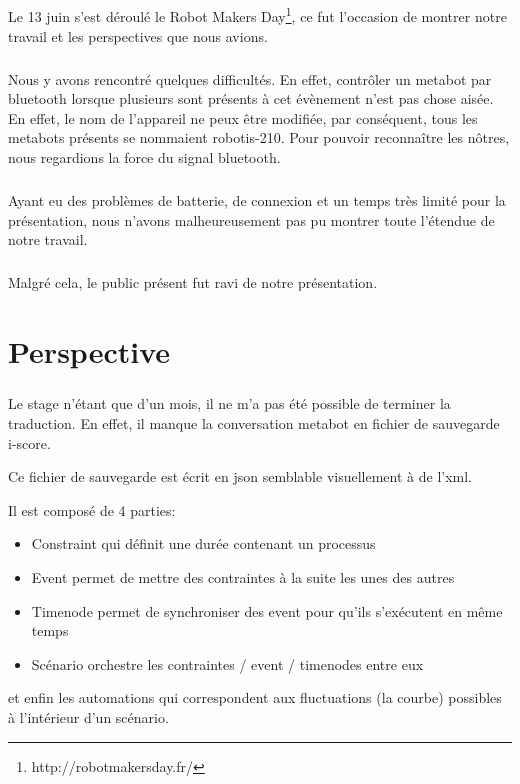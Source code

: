 \documentclass[10pt,a4paper]{report}
\begin{document}
\paragraph{}
Le 13 juin s'est déroulé le Robot Makers Day\footnote{http://robotmakersday.fr/}, ce fut l'occasion de montrer notre travail et les perspectives que nous avions.
\paragraph{}
Nous y avons rencontré quelques difficultés. En effet, contrôler un metabot par bluetooth lorsque plusieurs sont présents à cet évènement n'est pas chose aisée. En effet, le nom de l'appareil ne peux être modifiée, par conséquent, tous les metabots présents se nommaient robotis-210. Pour pouvoir reconnaître les nôtres, nous regardions la force du signal bluetooth.
\paragraph{}
Ayant eu des problèmes de batterie, de connexion et un temps très limité pour la présentation, nous n'avons malheureusement pas pu montrer toute l'étendue de notre travail.
\paragraph{}
Malgré cela, le public présent fut ravi de notre présentation.

\paragraph{}
\chapter{Perspective}
\paragraph{}
Le stage n'étant que d'un mois, il ne m'a pas été possible de terminer la traduction. En effet, il manque la conversation metabot en fichier de sauvegarde i-score.

Ce fichier de sauvegarde est écrit en \acrfull{json} semblable visuellement à de l'xml.

Il est composé de 4 parties:
\begin{itemize}
\item Constraint qui définit une durée contenant un processus
\item Event permet de mettre des contraintes à la suite les unes des autres
\item Timenode permet de synchroniser des event pour qu'ils s'exécutent en même temps
\item Scénario orchestre les contraintes / event / timenodes entre eux
\end{itemize}
et enfin les automations qui correspondent aux fluctuations (la courbe) possibles à l'intérieur d'un scénario.
\end{document}
